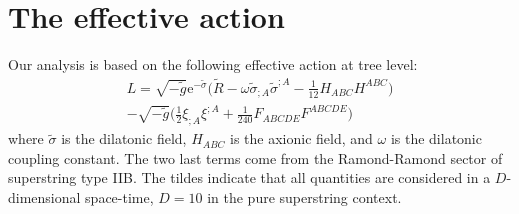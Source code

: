 \documentclass[a4paper,aps,twocolumn,prd,showpacs,nofootinbib]{revtex4}
\newcommand{\ee}{\mathrm{e}}
\newcommand{\si}{\scriptscriptstyle}
\begin{document}
\section{The effective action}

Our analysis is based on the following effective action at tree level:
\begin{eqnarray}
L = \sqrt{-\tilde g}\ee^{-\tilde\sigma}\biggl(\tilde R -
\omega\tilde\sigma_{;\si{A}}\tilde\sigma^{;\si{A}} -
\frac{1}{12}H_{\si{ABC}}H^{\si{ABC}}\biggr)\nonumber \\ - \sqrt{-
\tilde g}\biggr(\frac{1}{2}\xi_{;\si{A}}\xi^{;\si{A}} +
\frac{1}{240}F_{\si{ABCDE}}F^{\si{ABCDE}}\biggr)\label{lagrange}
\end{eqnarray}
where $\tilde\sigma$ is the dilatonic field, $H_{\si{ABC}}$ is the
axionic field, and $\omega$ is the dilatonic coupling constant.  The
two last terms come from the Ramond-Ramond sector of superstring type
IIB. The tildes indicate that all quantities are considered in a
$D$-dimensional space-time, $D = 10$ in the pure superstring context.
\end{document}
